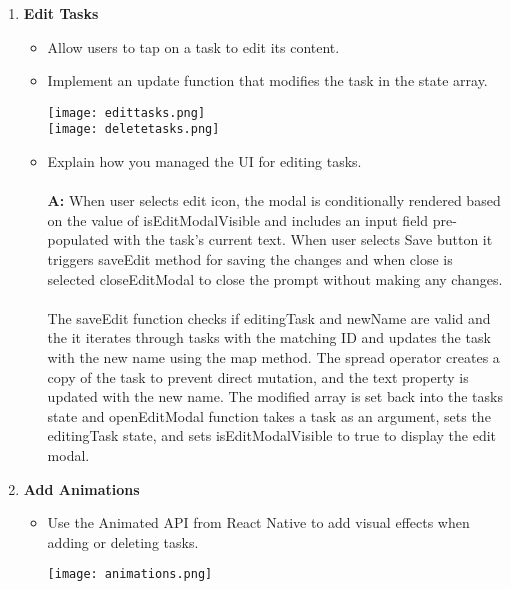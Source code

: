\documentclass{article}
\begin{document}
\begin{enumerate}
\begin{itemize}
                \end{itemize}
            \item \textbf{Edit Tasks}
                \begin{itemize}
                    \item Allow users to tap on a task to edit its content.
                    \item Implement an update function that modifies the task in the state array.
                     \begin{center}
                    \texttt{[image: edittasks.png]}\\
                      \texttt{[image: deletetasks.png]}\\
                    \end{center}
                    \item Explain how you managed the UI for editing tasks.\\
                    \\
                    \textbf{A:} When user selects edit icon, the modal is conditionally rendered based on the value of isEditModalVisible and includes an input field pre-populated with the task's current text. When user selects Save button it triggers  saveEdit method for saving the changes and when close is selected closeEditModal to close the prompt without making any changes.\\
                    \\
        The saveEdit function checks if editingTask and newName are valid and the it iterates through tasks with the matching ID and updates the task with the new name using the map method. The spread operator creates a copy of the task to prevent direct mutation, and the text property is updated with the new name. The modified array is set back into the tasks state and  openEditModal function takes a task as an argument, sets the editingTask state, and sets isEditModalVisible to true to display the edit modal. 
                \end{itemize}
            \item \textbf{Add Animations}
                \begin{itemize}
                    \item Use the Animated API from React Native to add visual effects when adding or deleting tasks.
                      \begin{center}
                      \texttt{[image: animations.png]}\\

\end{center}
\end{itemize}
\end{enumerate}
\end{document}
